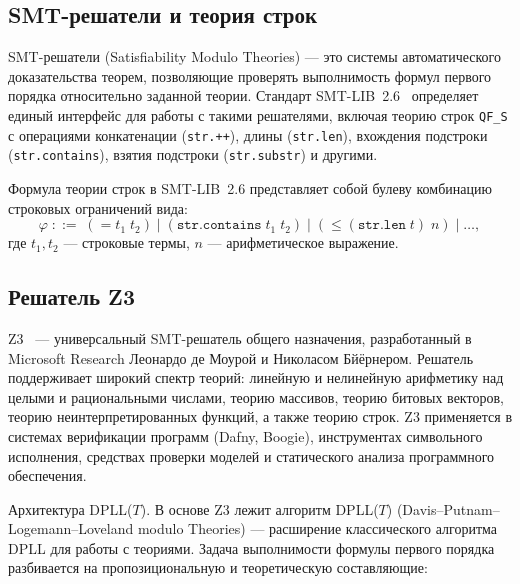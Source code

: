 \documentclass[14pt, russian]{scrartcl}
\begin{document}
\subsection{SMT-решатели и теория строк}

SMT-решатели (Satisfiability Modulo Theories) --- это системы автоматического
доказательства теорем, позволяющие проверять выполнимость формул первого порядка
относительно заданной теории. Стандарт SMT-LIB~2.6~\cite{barrett2017} определяет
единый интерфейс для работы с такими решателями, включая теорию строк \texttt{QF\_S}
с операциями конкатенации ({\tt str.++}), длины ({\tt str.len}), вхождения подстроки
({\tt str.contains}), взятия подстроки ({\tt str.substr}) и другими.

Формула теории строк в SMT-LIB~2.6 представляет собой булеву комбинацию
строковых ограничений вида:
\begin{equation}
  \varphi \;::=\; (= t_1\; t_2) \mid (\texttt{str.contains}\; t_1\; t_2) \mid
  (\leq (\texttt{str.len}\; t)\; n) \mid \ldots,
\end{equation}
где $t_1, t_2$ --- строковые термы, $n$ --- арифметическое выражение.

\subsection{Решатель Z3}

Z3~\cite{demoura2008} --- универсальный SMT-решатель общего назначения, разработанный
в Microsoft Research Леонардо де Моурой и Николасом Бйёрнером. Решатель поддерживает
широкий спектр теорий: линейную и нелинейную арифметику над целыми и рациональными
числами, теорию массивов, теорию битовых векторов, теорию неинтерпретированных
функций, а также теорию строк. Z3 применяется в системах верификации программ
(Dafny, Boogie), инструментах символьного исполнения, средствах проверки моделей
и статического анализа программного обеспечения.

\medskip Архитектура DPLL($T$).
В основе Z3 лежит алгоритм DPLL($T$) (Davis--Putnam--Logemann--Loveland modulo
Theories) --- расширение классического алгоритма DPLL для работы с теориями.
Задача выполнимости формулы первого порядка разбивается на пропозициональную
и теоретическую составляющие:
\end{document}
